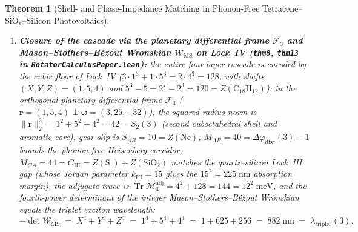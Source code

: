 \documentclass[11pt,a4paper]{article}
\theoremstyle{plain}
\newtheorem{theorem}{Theorem}[section]
\theoremstyle{definition}
\begin{document}
\begin{theorem}[Shell- and Phase-Impedance Matching in Phonon-Free Tetracene--$\mathrm{SiO_x}$--Silicon Photovoltaics]
\begin{enumerate}[label=\textbf{(\roman*)},leftmargin=*]
  separating the two triplets along orthogonal cuboctahedral rays at phase offset $\Delta\varphi = Q_\square(3) = 128$ enforces $\mathcal{C}_3(128) = 0$ (suppressing biexciton Auger self-quenching), each seam hop $\Delta\varphi_{\mathrm{seam}} = 21 < 41 = \Delta\varphi_{\mathrm{disc}}(3)$ emits $\hat{n}_E(21) = 0$ thermal phonons, and refractive-index matching at $n_1/n_2 = \mathrm{mod\_bits}(3)/|{\triangle}(3)| = 9/8$ yields Fresnel transmittance
  \[
    T_{\mathrm{Fresnel}}(3) \;=\; 1 - \left(\frac{9-8}{9+8}\right)^2 \;=\; \frac{288}{289} \;\approx\; 99.654\%.
  \]
\item \textbf{Closure of the cascade via the planetary differential frame $\mathcal{F}_3$ and Mason--Stothers--B\'ezout Wronskian $\mathcal{W}_{\mathrm{MS}}$ on Lock~IV (\texttt{thm8}, \texttt{thm13} in \texttt{RotatorCalculusPaper.lean}):}
  the entire four-layer cascade is encoded by the cubic floor of Lock~IV ($3\cdot 1^3 + 1\cdot 5^3 = 2\cdot 4^3 = 128$, with shafts $(X,Y,Z) = (1,5,4)$ and $5^3 - 5 = 2^7 - 2^3 = 120 = Z(\mathrm{C_{18}H_{12}})$): in the orthogonal planetary differential frame $\mathcal{F}_3$ ($\mathbf{r} = (1,5,4)\perp\mathbf{\omega} = (3,25,-32)$), the squared radius norm is $\|\mathbf{r}\|_2^2 = 1^2 + 5^2 + 4^2 = 42 = S_2(3)$ (second cuboctahedral shell and aromatic core), gear slip is $S_{AB} = 10 = Z(\mathrm{Ne})$, $M_{AB} = 40 = \Delta\varphi_{\mathrm{disc}}(3) - 1$ bounds the phonon-free Heisenberg corridor, $M_{CA} = 44 = C_{\mathrm{III}} = Z(\mathrm{Si}) + Z(\mathrm{SiO_2})$ matches the quartz--silicon Lock~III gap (whose Jordan parameter $k_{\mathrm{III}} = 15$ gives the $15^2 = 225\;\text{nm}$ absorption margin), the adjugate trace is $\operatorname{Tr}\mathcal{M}_3^{\mathrm{adj}} = 4^2 + 128 = 144 = 12^2\;\text{meV}$, and the fourth-power determinant of the integer Mason--Stothers--B\'ezout Wronskian equals the triplet exciton wavelength:
  \begin{equation}
    \label{eq:wms-882}
    -\det\mathcal{W}_{\mathrm{MS}} \;=\; X^4 + Y^4 + Z^4 \;=\; 1^4 + 5^4 + 4^4 \;=\; 1 + 625 + 256 \;=\; 882\;\text{nm} \;=\; \lambda_{\mathrm{triplet}}(3).
  \end{equation}
\end{enumerate}
\end{theorem}
\end{document}
